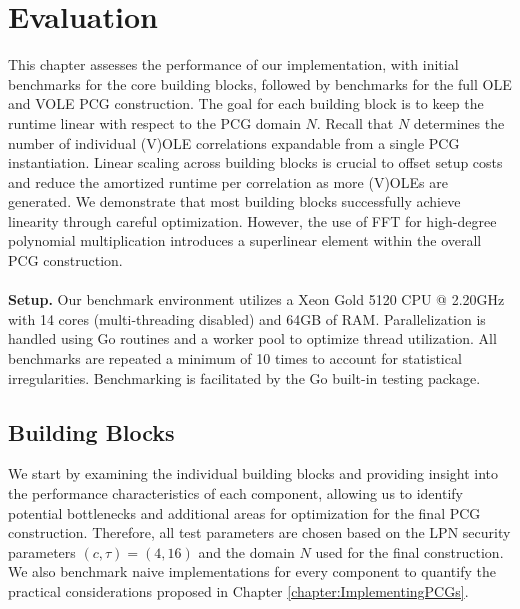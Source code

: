 \chapter{Evaluation}
\label{chapter:evaluation}
This chapter assesses the performance of our implementation, with initial benchmarks for the core building blocks, followed by benchmarks for the full OLE and VOLE PCG construction. The goal for each building block is to keep the runtime linear with respect to the PCG domain $N$. Recall that $N$ determines the number of individual (V)OLE correlations expandable from a single PCG instantiation. Linear scaling across building blocks is crucial to offset setup costs and reduce the amortized runtime per correlation as more (V)OLEs are generated. We demonstrate that most building blocks successfully achieve linearity through careful optimization. However, the use of FFT for high-degree polynomial multiplication introduces a superlinear element within the overall PCG construction.
\\\\
\textbf{Setup.} Our benchmark environment utilizes a Xeon Gold 5120 CPU @ 2.20GHz with 14 cores (multi-threading disabled) and 64GB of RAM. Parallelization is handled using Go routines and a worker pool to optimize thread utilization. All benchmarks are repeated a minimum of 10 times to account for statistical irregularities. Benchmarking is facilitated by the Go built-in testing package. 

\section{Building Blocks}
We start by examining the individual building blocks and providing insight into the performance characteristics of each component, allowing us to identify potential bottlenecks and additional areas for optimization for the final PCG construction. Therefore, all test parameters are chosen based on the LPN security parameters $(c,\tau)=(4,16)$ and the domain $N$ used for the final construction. We also benchmark naive implementations for every component to quantify the practical considerations proposed in Chapter \ref{chapter:ImplementingPCGs}.


